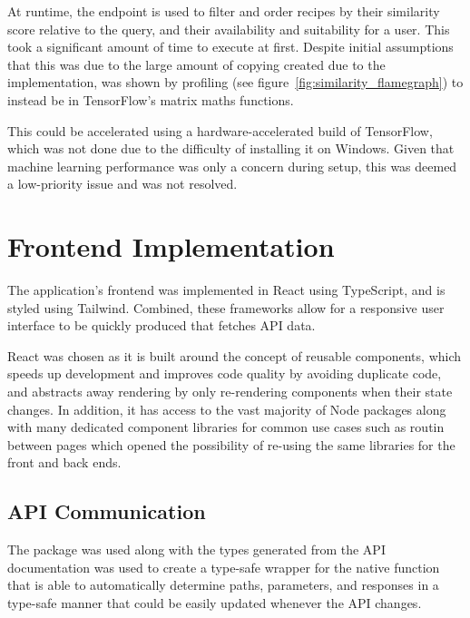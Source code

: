 At runtime, the  endpoint is used to filter and order recipes by their similarity score
relative to the query, and their availability and suitability for a user.
This took a significant amount of time to execute at first. Despite initial assumptions that this was due to the large amount of copying
created due to the implementation, was shown by profiling (see figure~\ref{fig:similarity_flamegraph}) to instead be in TensorFlow's
matrix maths functions.

This could be accelerated using a hardware-accelerated build of TensorFlow, which was not done due to the difficulty of installing
it on Windows. Given that machine learning performance was only a concern during setup, this was deemed a low-priority
issue and was not resolved.

\section{Frontend Implementation}

The application's frontend was implemented in React using TypeScript, and is styled using Tailwind. Combined,
these frameworks allow for a responsive user interface to be quickly produced that fetches API data.

React was chosen as it is built around the concept of reusable components, which speeds up development and
improves code quality by avoiding duplicate code,~\cite{hordijk_harmfulness_2009} and abstracts away rendering
by only re-rendering components when their state changes. In addition, it has access to the vast majority of
Node packages along with many dedicated component libraries for common use cases such as routin between pages
which opened the possibility of re-using the same libraries for the front and back ends.~\cite{saks_javascript_2019}

\subsection{API Communication}
The  package was used along with the types generated from the API documentation was
used to create a type-safe wrapper for the native  function that is able to automatically
determine paths, parameters, and responses in a type-safe manner that could be easily updated whenever the API
changes.

